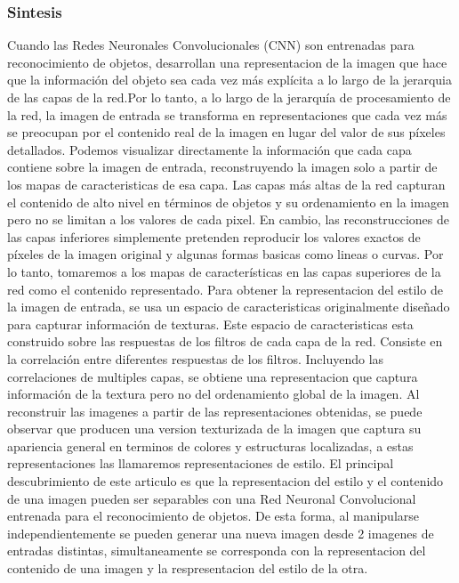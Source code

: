 \documentclass[a4paper,10pt]{article}
\begin{document}
    \subsubsection{Sintesis}
      Cuando las Redes Neuronales Convolucionales (CNN) son entrenadas para reconocimiento de objetos, desarrollan una representacion de la imagen que hace que la información 
      del objeto sea cada vez más explícita a lo largo de la jerarquia de las capas de la red.Por lo tanto, a lo largo de la jerarquía de procesamiento de la red, 
      la imagen de entrada se transforma en representaciones que cada vez más se preocupan por el contenido real de la imagen en lugar del valor de sus píxeles detallados. 
      Podemos visualizar directamente la información que cada capa contiene sobre la imagen de entrada, reconstruyendo la imagen solo a partir de los mapas de caracteristicas
      de esa capa. Las capas más altas de la red capturan el contenido de alto nivel en términos de objetos y su ordenamiento en la imagen pero no se limitan a los valores de cada 
      pixel. En  cambio, las reconstrucciones de las capas inferiores simplemente pretenden reproducir los valores exactos de píxeles de la imagen original y algunas formas
      basicas como lineas o curvas. Por lo tanto, tomaremos a los mapas de características en las capas superiores de la red como el contenido representado.
      Para obtener la representacion del estilo de la imagen de entrada, se usa un espacio de caracteristicas originalmente diseñado para capturar información de texturas.
      Este espacio de caracteristicas esta construido sobre las respuestas de los filtros de cada capa de la red. Consiste en la correlación entre diferentes respuestas de los filtros.
      Incluyendo las correlaciones de multiples capas, se obtiene una representacion que captura información de la textura pero no del ordenamiento global de la imagen.
      Al reconstruir las imagenes a partir de las representaciones obtenidas, se puede observar que producen una version texturizada de la imagen que captura su 
      apariencia general en terminos de colores y estructuras localizadas, a estas representaciones las llamaremos representaciones de estilo.
      El principal descubrimiento de este articulo es que la representacion del estilo y el contenido de una imagen pueden ser separables con una Red Neuronal Convolucional entrenada 
      para el reconocimiento de objetos. De esta forma, al manipularse independientemente se pueden generar una nueva imagen desde 2 imagenes de entradas distintas, simultaneamente se corresponda con la representacion
      del contenido de una imagen y la respresentacion del estilo de la otra.
\end{document}
